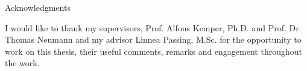 \thispagestyle{empty}

\vspace*{2cm}

\begin{center}
{ Acknowledgments}
\end{center}

\vspace{1cm}

I would like to thank my supervisors, Prof. Alfons Kemper, Ph.D. and Prof. Dr. Thomas Neumann and my advisor Linnea Passing, M.Sc. for the opportunity to work on this thesis, their useful comments, remarks and engagement throughout the work.

\cleardoublepage{}
